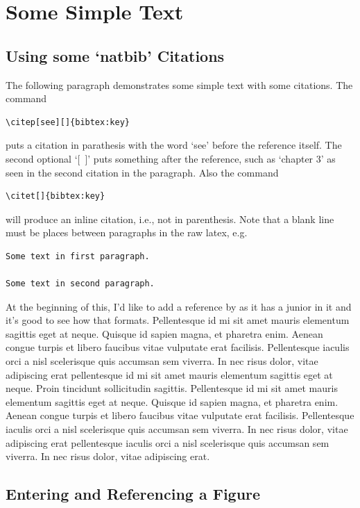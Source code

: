 \chapter{Some Simple Text}

\section{Using some `natbib' Citations}

The following paragraph demonstrates some simple text with some citations. The
command
\begin{verbatim}
\citep[see][]{bibtex:key}
\end{verbatim}
puts a citation in parathesis with the word `see' before the
reference itself. The second optional `[~]' puts something after the reference,
such as `chapter 3' as seen in the second citation in the paragraph. Also the
command
\begin{verbatim}
\citet[]{bibtex:key}
\end{verbatim}
will produce an inline citation, i.e., not in parenthesis. Note that a blank
line must be places between paragraphs in the raw latex, e.g.
\begin{verbatim}
Some text in first paragraph.

Some text in second paragraph.
\end{verbatim}

At the beginning of this, I'd like to add a reference by \citet{Afjeh:1986:JoFE}
as it has a junior in it and it's good to see how that formats. Pellentesque id
mi sit amet mauris elementum sagittis eget at neque. Quisque id sapien magna, et
pharetra enim. Aenean congue turpis et libero faucibus vitae vulputate erat
facilisis. Pellentesque iaculis orci a nisl scelerisque quis accumsan sem
viverra. In nec risus dolor, vitae adipiscing erat
\citep[see][]{Solomon:2007:CUP} pellentesque id mi sit amet mauris elementum
sagittis eget at neque. Proin tincidunt sollicitudin sagittis. Pellentesque id
mi sit amet mauris elementum sagittis eget at neque. Quisque id sapien magna, et
pharetra enim. Aenean congue turpis et libero faucibus vitae vulputate erat
facilisis. Pellentesque iaculis orci a nisl scelerisque quis accumsan sem
viverra. In nec risus dolor, vitae adipiscing erat
\citep[see][]{Jaccard:2005:CUP} pellentesque iaculis orci a nisl scelerisque
quis accumsan sem viverra. In nec risus dolor, vitae adipiscing erat.

\section{Entering and Referencing a Figure}

